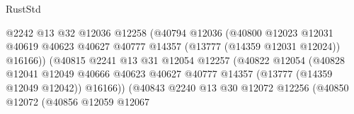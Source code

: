 \begin{lexlean}{RustStd}
\begin{coremodule}
                                              @2242
                                              @13
                                              @32
                                              @12036
                                              @12258
                                              (@40794
                                                @12036
                                                (@40800
                                                  @12023
                                                  @12031
                                                  @40619
                                                  @40623
                                                  @40627
                                                  @40777
                                                  @14357
                                                  (@13777 (@14359 @12031 @12024))
                                                  @16166))
                                              (@40815
                                                @2241
                                                @13
                                                @31
                                                @12054
                                                @12257
                                                (@40822
                                                  @12054
                                                  (@40828
                                                    @12041
                                                    @12049
                                                    @40666
                                                    @40623
                                                    @40627
                                                    @40777
                                                    @14357
                                                    (@13777 (@14359 @12049 @12042))
                                                    @16166))
                                                (@40843
                                                  @2240
                                                  @13
                                                  @30
                                                  @12072
                                                  @12256
                                                  (@40850
                                                    @12072
                                                    (@40856
                                                      @12059
                                                      @12067

\end{coremodule}
\end{lexlean}
